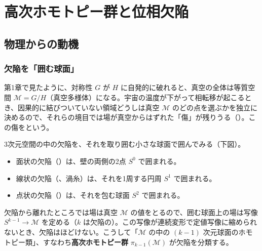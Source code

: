 \chapter{高次ホモトピー群と位相欠陥}\label{ch:03}

\section{物理からの動機}

\subsection*{欠陥を「囲む球面」}
第1章で見たように、対称性 $G$ が $H$ に自発的に破れると、真空の全体は等質空間 $\mathcal{M}=G/H$（真空多様体）になる。宇宙の温度が下がって相転移が起こるとき、因果的に結びついていない領域どうしは真空 $\mathcal M$ のどの点を選ぶかを独立に決めるので、それらの境目では場が真空からはずれた「傷」が残りうる（）。この傷をという。

3次元空間の中の欠陥を、それを取り囲む小さな球面で囲んでみる（下図）。
\begin{itemize}
\item 面状の欠陥（）は、壁の両側の2点 $S^0$ で囲まれる。
\item 線状の欠陥（、渦糸）は、それを1周する円周 $S^1$ で囲まれる。
\item 点状の欠陥（）は、それを包む球面 $S^2$ で囲まれる。
\end{itemize}
欠陥から離れたところでは場は真空 $\mathcal M$ の値をとるので、囲む球面上の場は写像 $S^{k-1}\to\mathcal{M}$ を定める（$k$ は欠陥の）。この写像が連続変形で定値写像に縮められないとき、欠陥はほどけない。こうして「$\mathcal M$ の中の $(k-1)$ 次元球面のホモトピー類」、すなわち\textbf{高次ホモトピー群} $\pi_{k-1}(\mathcal M)$ が欠陥を分類する。

